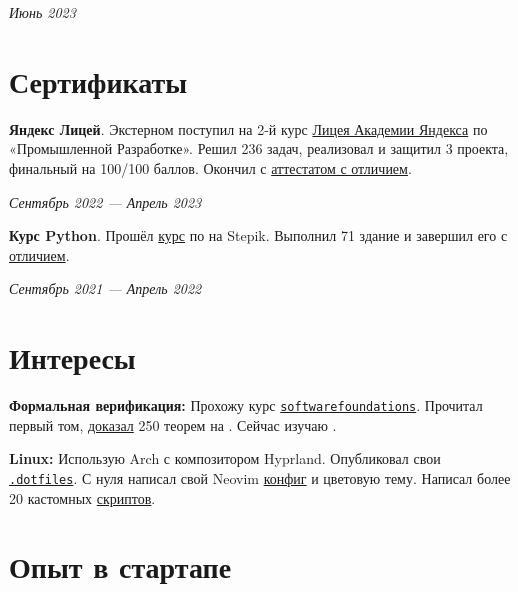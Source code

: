 \documentclass[margin,line]{resume}
\begin{document}
\begin{resume}
  \hfill \textsl{Июнь 2023}

  \section{\mysidestyle Сертификаты}
  \textbf{Яндекс Лицей}. Экстерном поступил на 2-й курс
  \href{https://lyceum.yandex.ru/}{Лицея
  Академии Яндекса} по «Промышленной Разработке». Решил 236 задач,
  реализовал и защитил 3 проекта, финальный на 100/100 баллов. Окончил с
  \href{https://alchemmist.github.io/CV/attachments/yandex-lyceum.pdf}{аттестатом
  с отличием}.

  \vspace{-6mm}

  \hfill \textsl{Сентябрь 2022 — Апрель 2023}

  \textbf{Курс Python}. Прошёл
  \href{https://stepik.org/course/67}{курс} по  на
  Stepik. Выполнил 71
  здание и завершил его с
  \href{https://alchemmist.github.io/CV/attachments/stepik-python-course.pdf}{отличием}.

  \vspace{-7mm}

  \hfill \textsl{Сентябрь 2021 — Апрель 2022}
  \vspace{-4mm}
  \section{\mysidestyle Интересы}\vspace{0.7mm}

  {\textbf{Формальная верификация:} Прохожу курс
    \texttt{\href{https://softwarefoundations.cis.upenn.edu}{softwarefoundations}}.
    Прочитал первый том,
    \href{https://github.com/alchemmist/coq-learning}{доказал} 250
теорем на . Сейчас изучаю .} \\

  \vspace{-6mm}

  \textbf{Linux:} Использую Arch с композитором Hyprland. Опубликовал
  свои
  \href{https:/github.com/alchemmist/.dotfiles}{\texttt{.dotfiles}}.
  С нуля написал свой Neovim
  \href{https://github.com/alchemmist/.dotfiles/tree/main/nvim}{конфиг}
  и цветовую тему.
  Написал более 20 кастомных
  \href{https://github.com/alchemmist/.dotfiles/tree/main/scripts}{скриптов}.

  \vfill

  \section{\mysidestyle Опыт в стартапе}\vspace{2mm}


\end{resume}
\end{document}
